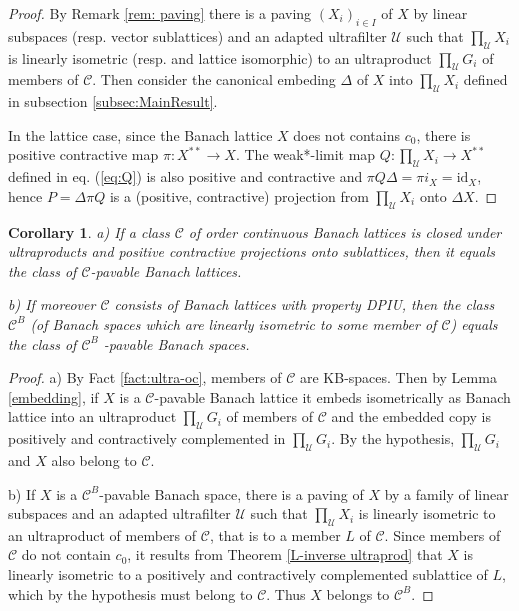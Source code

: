 \documentclass[11pt]{amsart}
\theoremstyle{plain}
\newtheorem{corollary}[theorem]{Corollary}
\theoremstyle{remark}
\newcommand{\C}{\mathcal C}
\newcommand{\U}{\mathcal U}
\begin{document}
\begin{proof}
By Remark \ref{rem: paving} there is a paving $(X_i)_{i\in I}$ of $X$ by linear subspaces (resp. vector sublattices) and an adapted ultrafilter $\U$ such that $\prod_\U X_i$ is linearly isometric (resp. and lattice isomorphic) to an ultraproduct $\prod_\U G_i$ of members of $\C$. Then consider the canonical embeding $\Delta$ of $X$ into $\prod_\U X_i$ defined in subsection \ref{subsec:MainResult}.

In the lattice case, since the Banach lattice $X$ does not contains $c_0$, there is positive  contractive map 
$\pi: X^{**}\to X$. The weak*-limit map $Q:\prod_\U X_i\to X^{**}$ defined in eq. (\ref{eq:Q}) is also positive and contractive and 
$\pi Q\Delta=\pi i_X=\mathrm{id}_X$, hence $P=\Delta\pi Q$ is a (positive, contractive) projection from $\prod_\U X_i$ onto $\Delta X$.
\end{proof}

\begin{corollary}\label{cor:C=C^B}
a) If a class $\C$ of order continuous Banach lattices is closed under ultraproducts and positive contractive projections onto sublattices, then it equals the class of  $\C$-pavable Banach lattices. 

b) If moreover $\C$ consists of Banach lattices with property DPIU, then the class $\C^B$ (of Banach spaces which are linearly isometric to some member of $\mathcal C$) equals the class of $\C^B\!$
-pavable Banach spaces. 
\end{corollary}


\begin{proof}
a) By Fact \ref{fact:ultra-oc}, members of  $\C$ are KB-spaces.  
Then by Lemma \ref{embedding}, if $X$ is a $\C$-pavable Banach lattice  it embeds isometrically as Banach lattice into an ultraproduct $\prod_\U G_i$ of members of $\C$ and the embedded copy is positively and contractively complemented in $\prod_\U G_i$. By the hypothesis, $\prod_\U G_i$ and $X$ also belong to $\C$.
\smallskip

b) If $X$ is a $\C^B$-pavable Banach space, there is a paving of $X$ by a family of linear subspaces and an adapted ultrafilter $\U$ such that $\prod_\U X_i$ is linearly isometric to an ultraproduct of members of $\C$, that is to a member $L$ of $\C$. Since members of $\C$ do not contain $c_0$, it  results from Theorem \ref{L-inverse ultraprod} that $X$ is linearly isometric to a positively and contractively complemented sublattice of $L$, which by the hypothesis must belong to $\C$. Thus $X$ belongs to $\C^B$.
\end{proof}
\end{document}
